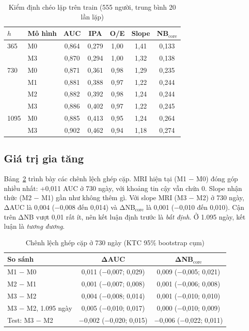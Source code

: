 \documentclass[conference]{IEEEtran}
\begin{document}
\begin{table}[t]
\caption{Kiểm định chéo lặp trên train (555 người, trung bình 20 lần lặp)}
\label{tab:cv}
\centering\footnotesize
\begin{tabular}{@{}llccccc@{}}
\toprule
$h$ & Mô hình & AUC & IPA & O/E & Slope & NB$_{\text{core}}$\\
\midrule
365 & M0 & 0,864 & 0,279 & 1,00 & 1,41 & 0,133\\
    & M3 & 0,870 & 0,294 & 1,00 & 1,32 & 0,138\\
730 & M0 & 0,871 & 0,361 & 0,98 & 1,29 & 0,235\\
    & M1 & 0,881 & 0,388 & 0,97 & 1,22 & 0,244\\
    & M2 & 0,882 & 0,392 & 0,98 & 1,24 & 0,244\\
    & M3 & 0,886 & 0,402 & 0,97 & 1,22 & 0,245\\
1095& M0 & 0,885 & 0,413 & 0,95 & 1,24 & 0,264\\
    & M3 & 0,902 & 0,462 & 0,94 & 1,18 & 0,274\\
\bottomrule
\end{tabular}
\end{table}

\subsection{Giá trị gia tăng}
Bảng~\ref{tab:delta} trình bày các chênh lệch ghép cặp. MRI hiện tại (M1 − M0) đóng góp nhiều nhất: +0,011 AUC ở 730 ngày, với khoảng tin cậy vẫn chứa 0. Slope nhận thức (M2 − M1) gần như không thêm gì. Với slope MRI (M3 − M2) ở 730 ngày, ΔAUC là 0,004 (−0,008 đến 0,014) và ΔNB$_{\text{core}}$ là 0,001 (−0,010 đến 0,010). Cận trên ΔNB vượt 0,01 rất ít, nên kết luận định trước là \emph{bất định}. Ở 1.095 ngày, kết luận là \emph{tương đương}.

\begin{table}[t]
\caption{Chênh lệch ghép cặp ở 730 ngày (KTC 95\% bootstrap cụm)}
\label{tab:delta}
\centering\footnotesize
\begin{tabular}{@{}lcc@{}}
\toprule
So sánh & ΔAUC & ΔNB$_{\text{core}}$\\
\midrule
M1 − M0 & 0,011 (−0,007; 0,029) & 0,009 (−0,005; 0,021)\\
M2 − M1 & 0,001 (−0,007; 0,008) & 0,001 (−0,006; 0,008)\\
M3 − M2 & 0,004 (−0,008; 0,014) & 0,001 (−0,010; 0,010)\\
M3 − M2, 1.095 ngày & 0,005 (−0,010; 0,017) & 0,000 (−0,010; 0,009)\\
Test: M3 − M2 & −0,002 (−0,020; 0,015) & −0,006 (−0,022; 0,011)\\
\bottomrule
\end{tabular}
\end{table}
\end{document}
